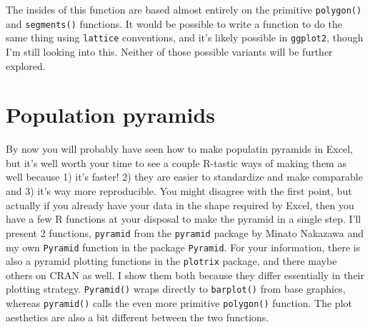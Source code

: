 \documentclass[a4paper]{article}
\begin{document}
The insides of this function are based almost entirely on the primitive \texttt{polygon()} and \texttt{segments()} functions. It would be possible to write a function to do the same thing using \texttt{lattice} conventions, and it's likely possible in \texttt{ggplot2}, though I'm still looking into this. Neither of those possible variants will be further explored.

\pagebreak
\section{Population pyramids}
By now you will probably have seen how to make populatin pyramids in Excel, but it's well worth your time to see a couple R-tastic ways of making them as well because 1) it's faster! 2) they are easier to standardize and make comparable and 3) it's way more reproducible. You might disagree with the first point, but actually if you already have your data in the shape required by Excel, then you have a few R functions at your disposal to make the pyramid in a single step. I'll present 2 functions, \texttt{pyramid} from the \texttt{pyramid} package by Minato Nakazawa and my own \texttt{Pyramid} function in the package \texttt{Pyramid}. For your information, there is also a pyramid plotting functions in the \texttt{plotrix} package, and there maybe others on CRAN as well. I show them both because they differ essentially in their plotting strategy. \texttt{Pyramid()} wraps directly to \texttt{barplot()} from base graphics, whereas \texttt{pyramid()} calls the even more primitive \texttt{polygon()} function. The plot aesthetics are also a bit different between the two functions.\\
\end{document}
